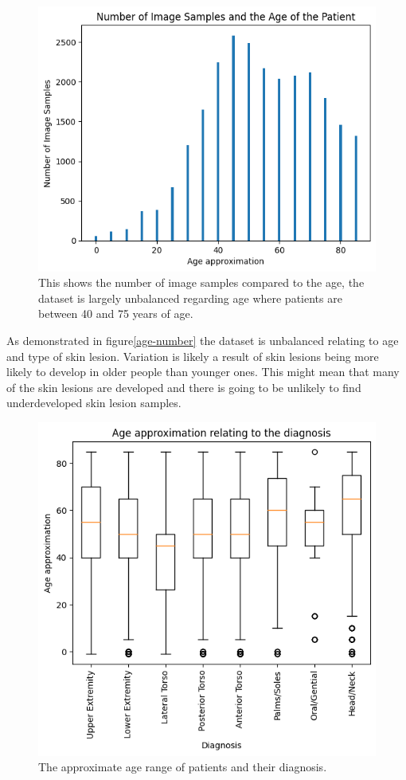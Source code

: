 \begin{figure}
    \centering
    \includegraphics[scale=0.75]{images/ISIC/age-number.png}
    \caption{This shows the number of image samples compared to the age, the dataset is largely unbalanced regarding age where patients are between 40 and 75 years of age.}
\end{figure} \label{age-number}

As demonstrated in figure\ref{age-number} the dataset is unbalanced relating to age and type of skin lesion. Variation is likely a result of skin lesions being more likely to develop in older people than younger ones. This might mean that many of the skin lesions are developed and there is going to be unlikely to find underdeveloped skin lesion samples.

\begin{figure}
    \centering
    \includegraphics[scale=0.75]{images/ISIC/diagnosis-age.png}
    \caption{The approximate age range of patients and their diagnosis.} 
\end{figure} \label{diagnosis-age}


